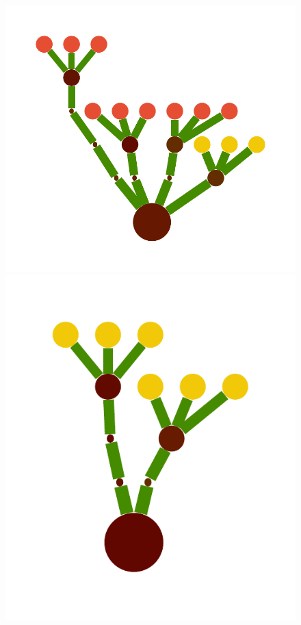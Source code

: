 \documentclass[a4paper,10pt]{article}
\begin{document}
\begin{figure}[b]
\begin{center}
\includegraphics[scale=.26]{./figures/1-tree-1.pdf}
\includegraphics[scale=.26]{./figures/1-tree-3.pdf}

\end{center}
\end{figure}
\end{document}
